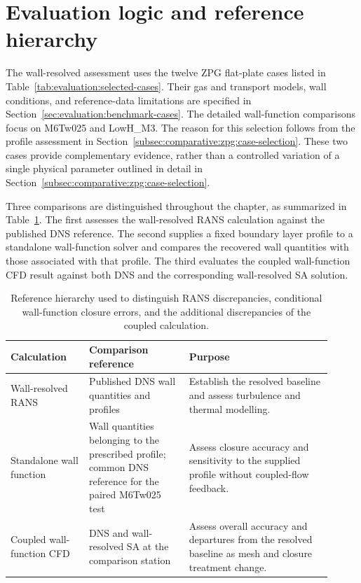 \section{Evaluation logic and reference hierarchy}
\label{sec:comparative:zpg:reference-data}

The wall-resolved assessment uses the twelve ZPG flat-plate cases listed in Table~\ref{tab:evaluation:selected-cases}. Their gas and transport models, wall conditions, and reference-data limitations are specified in Section~\ref{sec:evaluation:benchmark-cases}. The detailed wall-function comparisons focus on M6Tw025 and LowH\_M3. The reason for this selection follows from the profile assessment in Section~\ref{subsec:comparative:zpg:case-selection}. These two cases provide complementary evidence, rather than a controlled variation of a single physical parameter outlined in detail in Section~\ref{subsec:comparative:zpg:case-selection}.
\par\medskip

Three comparisons are distinguished throughout the chapter, as summarized in Table~\ref{tab:erriso:reference-hierarchy}. The first assesses the wall-resolved RANS calculation against the published DNS reference. The second supplies a fixed boundary layer profile to a standalone wall-function solver and compares the recovered wall quantities with those associated with that profile. The third evaluates the coupled wall-function CFD result against both DNS and the corresponding wall-resolved SA solution.

\begin{table}[!htbp]
    \centering
    \caption{Reference hierarchy used to distinguish RANS discrepancies, conditional wall-function closure errors, and the additional discrepancies of the coupled calculation.}
    \label{tab:erriso:reference-hierarchy}
    \small
    \begin{tabular}{@{}p{0.22\linewidth}p{0.29\linewidth}p{0.40\linewidth}@{}}
        \toprule
        Calculation & Comparison reference & Purpose \\
        \midrule
        Wall-resolved RANS & Published DNS wall quantities and profiles & Establish the resolved baseline and assess turbulence and thermal modelling. \\
        \addlinespace
        Standalone wall function & Wall quantities belonging to the prescribed profile; common DNS reference for the paired M6Tw025 test & Assess closure accuracy and sensitivity to the supplied profile without coupled-flow feedback. \\
        \addlinespace
        Coupled wall-function CFD & DNS and wall-resolved SA at the comparison station & Assess overall accuracy and departures from the resolved baseline as mesh and closure treatment change. \\
        \bottomrule
    \end{tabular}
\end{table}

